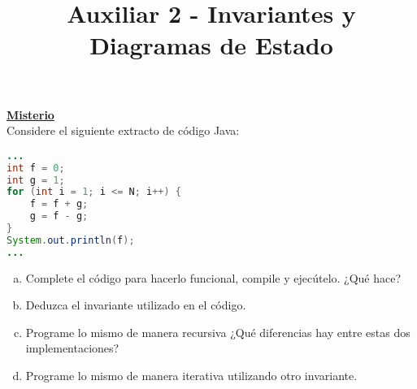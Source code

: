 \documentclass[dcc,uchile,sol]{fcfmcourse}
\title{Auxiliar 2 - Invariantes y Diagramas de Estado}
\begin{document}
\maketitle

\vspace{-1ex}


\begin{problems}
\problem \underline{\textbf{Misterio}}\\
Considere el siguiente extracto de código Java:
\begin{lstlisting}[language=Java, frame=single]
...
int f = 0;
int g = 1;
for (int i = 1; i <= N; i++) {
    f = f + g;
    g = f - g;
}
System.out.println(f);
...
\end{lstlisting}

\begin{enumerate}[a)]
    \item Complete el código para hacerlo funcional, compile y ejecútelo. ¿Qué hace?
    \item Deduzca el invariante utilizado en el código.
    \item Programe lo mismo de manera recursiva ¿Qué diferencias hay entre estas dos implementaciones? %
    \item Programe lo mismo de manera iterativa utilizando otro invariante.
\end{enumerate}


\end{problems}
\end{document}
